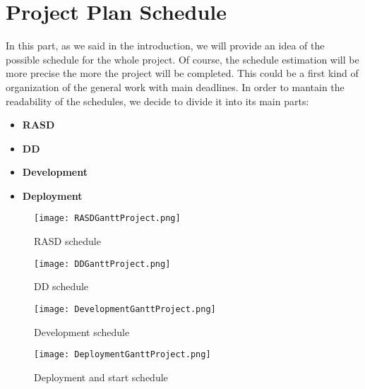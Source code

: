 \chapter{Project Plan Schedule}

In this part, as we said in the introduction, we will provide an idea of the possible schedule for the whole project.
Of course, the schedule estimation will be more precise the more the project will be completed.
This could be a first kind of organization of the general work with main deadlines.
In order to mantain the readability of the schedules, we decide to divide it into its main parts:
\newline
\begin{itemize}
\item \textbf{RASD}
\item \textbf{DD}
\item \textbf{Development}
\item \textbf{Deployment}
\end{itemize}

\clearpage

\vspace{32pt}

\begin{figure}[htbp]
\centering
\texttt{[image: RASDGanttProject.png]}
\caption{RASD schedule}
\end{figure}

\vspace{32pt}

\begin{figure}[htbp]
\centering
\texttt{[image: DDGanttProject.png]}
\caption{DD schedule}
\end{figure}

\clearpage

\vspace{32pt}

\begin{figure}[htbp]
\centering
\texttt{[image: DevelopmentGanttProject.png]}
\caption{Development schedule}
\end{figure}

\vspace{32pt}

\begin{figure}[htbp]
\centering
\texttt{[image: DeploymentGanttProject.png]}
\caption{Deployment and start schedule}
\end{figure}
